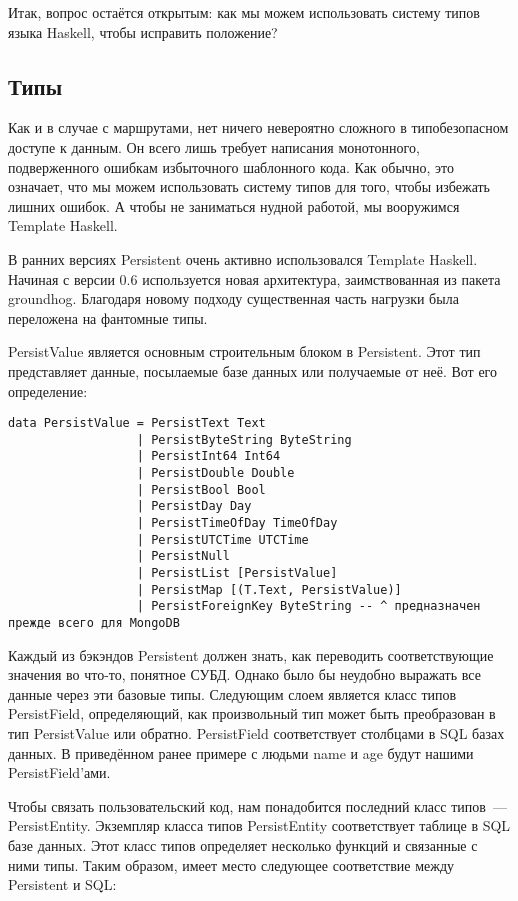Итак, вопрос остаётся открытым: как мы можем использовать систему типов языка
Haskell, чтобы исправить положение?

\subsection{Типы}
Как и в случае с маршрутами, нет ничего невероятно сложного в типобезопасном
доступе к данным. Он всего лишь требует написания монотонного, подверженного
ошибкам избыточного шаблонного кода. Как обычно, это означает, что мы можем
использовать систему типов для того, чтобы избежать лишних ошибок. А чтобы не
заниматься нудной работой, мы вооружимся Template Haskell.

\begin{remark}
    В ранних версиях Persistent очень активно использовался Template Haskell.
    Начиная с версии 0.6 используется новая архитектура, заимствованная из
    пакета groundhog. Благодаря новому подходу существенная часть нагрузки была
    переложена на фантомные типы.
\end{remark}

PersistValue является основным строительным блоком в Persistent. Этот тип
представляет данные, посылаемые базе данных или получаемые от неё. Вот его
определение:

\begin{lstlisting}
data PersistValue = PersistText Text
                  | PersistByteString ByteString
                  | PersistInt64 Int64
                  | PersistDouble Double
                  | PersistBool Bool
                  | PersistDay Day
                  | PersistTimeOfDay TimeOfDay
                  | PersistUTCTime UTCTime
                  | PersistNull
                  | PersistList [PersistValue]
                  | PersistMap [(T.Text, PersistValue)]
                  | PersistForeignKey ByteString -- ^ предназначен прежде всего для MongoDB
\end{lstlisting}

Каждый из бэкэндов Persistent должен знать, как переводить соответствующие
значения во что-то, понятное СУБД. Однако было бы неудобно выражать все данные
через эти базовые типы. Следующим слоем является класс типов PersistField,
определяющий, как произвольный тип может быть преобразован в тип PersistValue
или обратно. PersistField соответствует столбцами в SQL базах данных. В
приведённом ранее примере с людьми name и age будут нашими PersistField'ами.

Чтобы связать пользовательский код, нам понадобится последний класс типов~---
PersistEntity. Экземпляр класса типов PersistEntity соответствует таблице в SQL
базе данных. Этот класс типов определяет несколько функций и связанные с ними
типы. Таким образом, имеет место следующее соответствие между Persistent и SQL:

